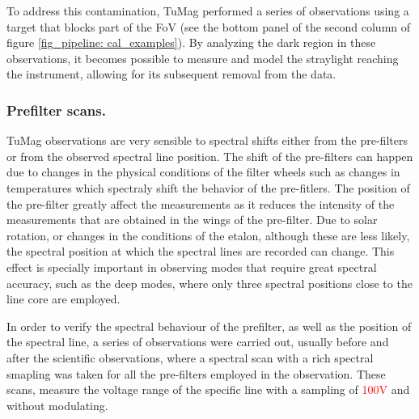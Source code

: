To address this contamination, TuMag performed a series of observations using a target that blocks part of the FoV (see the bottom panel of the second column of figure \ref{fig_pipeline: cal_examples}). By analyzing the dark region in these observations, it becomes possible to measure and model the straylight reaching the instrument, allowing for its subsequent removal from the data.

\subsubsection{Prefilter scans.}

TuMag observations are very sensible to spectral shifts either from the pre-filters or from the observed spectral line position. The shift of the pre-filters can happen due to changes in the physical conditions of the filter wheels such as changes in temperatures which spectraly shift the behavior of the pre-fitlers. The position of the pre-filter greatly affect the measurements as it reduces the intensity of the measurements that are obtained in the wings of the pre-filter. Due to solar rotation, or changes in the conditions of the etalon, although these are less likely, the spectral position at which the spectral lines are recorded can change. This effect is specially important in observing modes that require great spectral accuracy, such as the deep modes, where only three spectral positions close to the line core are employed. 

In order to verify the spectral behaviour of the prefilter, as well as the position of the spectral line, a series of observations were carried out, usually before and after the scientific observations, where a spectral scan with a rich spectral smapling was taken for all the pre-filters employed in the observation. These scans, measure the voltage range of the specific line with a sampling of \textcolor{red}{100V} and without modulating. 




